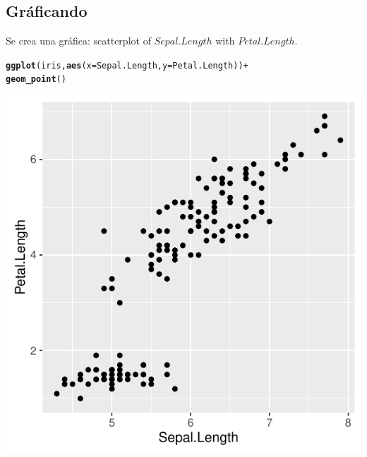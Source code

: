 \documentclass{article}\usepackage[]{graphicx}\usepackage[]{color}
\makeatletter
\def\maxwidth{ %
  \ifdim\Gin@nat@width>\linewidth
    \linewidth
  \else
    \Gin@nat@width
  \fi
}
\newcommand{\hlopt}[1]{\textcolor[rgb]{0,0,0}{#1}}%
\newcommand{\hlstd}[1]{\textcolor[rgb]{0.345,0.345,0.345}{#1}}%
\newcommand{\hlkwc}[1]{\textcolor[rgb]{0.333,0.667,0.333}{#1}}%
\newcommand{\hlkwd}[1]{\textcolor[rgb]{0.737,0.353,0.396}{\textbf{#1}}}%
\newenvironment{kframe}{%
 \def\at@end@of@kframe{}%
 \ifinner\ifhmode%
  \def\at@end@of@kframe{\end{minipage}}%
  \begin{minipage}{\columnwidth}%
 \fi\fi%
 \def\FrameCommand##1{\hskip\@totalleftmargin \hskip-\fboxsep
 \colorbox{shadecolor}{##1}\hskip-\fboxsep
     \hskip-\linewidth \hskip-\@totalleftmargin \hskip\columnwidth}%
 \MakeFramed {\advance\hsize-\width
   \@totalleftmargin\z@ \linewidth\hsize
   \@setminipage}}%
 {\par\unskip\endMakeFramed%
 \at@end@of@kframe}
\newenvironment{knitrout}{}{} %
\makeatother
\begin{document}
\subsection*{Gráficando}
Se crea una gráfica: scatterplot of $Sepal.Length$ with $Petal.Length$.
\begin{knitrout}
\color{fgcolor}\begin{kframe}
\begin{alltt}
\hlkwd{ggplot}\hlstd{(iris,} \hlkwd{aes}\hlstd{(}\hlkwc{x} \hlstd{= Sepal.Length,} \hlkwc{y} \hlstd{= Petal.Length))} \hlopt{+}
  \hlkwd{geom_point}\hlstd{()}
\end{alltt}
\end{kframe}

{\centering \includegraphics[width=\maxwidth]{figure/minimal-r17-1} 

}



\end{knitrout}
\end{document}
